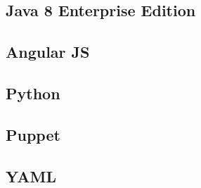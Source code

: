 \subsection{Java 8 Enterprise Edition}
\subsection{Angular JS}
\subsection{Python}
\subsection{Puppet}
\subsection{YAML}